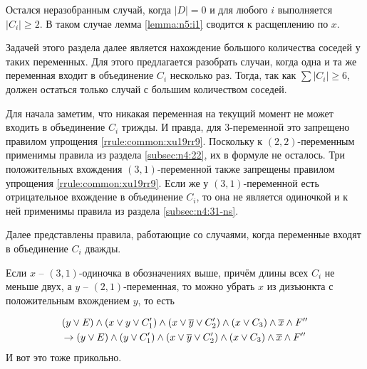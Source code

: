 Остался неразобранным случай, когда $|D| = 0$ и для любого $i$ выполняется $|C_i| \geq 2$.
В таком случае лемма \ref{lemma:n5:i1} сводится к расщеплению по $x$.

Задачей этого раздела далее является нахождение большого количества соседей у таких переменных.
Для этого предлагается разобрать случаи, когда одна и та же переменная входит в объединение $C_i$ несколько раз.
Тогда, так как $\sum |C_i| \geq 6$, должен остаться только случай с большим количеством соседей.

Для начала заметим, что никакая переменная на текущий момент не может входить в объединение $C_i$ трижды. И правда, для 3-переменной это запрещено правилом упрощения \ref{rrule:common:xu19rr9}. Поскольку к $(2,2)$-переменным применимы правила из раздела \ref{subsec:n4:22}, их в формуле не осталось. Три положительных вхождения $(3,1)$-переменной также запрещены правилом упрощения \ref{rrule:common:xu19rr9}. Если же у $(3,1)$-переменной есть отрицательное вхождение в объединение $C_i$, то она не является одиночкой и к ней применимы правила из раздела \ref{subsec:n4:31-ns}.

Далее представлены правила, работающие со случаями, когда переменные входят в объединение $C_i$ дважды.

\begin{rrule}
 Если $x$ -- $(3,1)$-одиночка в обозначениях выше, причём длины всех $C_i$ не меньше двух, а $y$ -- $(2,1)$-переменная, то можно убрать $x$ из дизъюнкта с положительным вхождением $y$, то есть

 \begin{gather*}
  (y \vee E) \wedge (x \vee y \vee C_1') \wedge (x \vee \overline{y} \vee C_2') \wedge (x \vee C_3) \wedge \overline{x} \wedge F''\\
  \rightarrow
  (y \vee E) \wedge (y \vee C_1') \wedge (x \vee \overline{y} \vee C_2') \wedge (x \vee C_3) \wedge \overline{x} \wedge F''
 \end{gather*}
 {\color{white} И вот это тоже прикольно.}
 \label{rrule:n4:31:3v-2}
\end{rrule}

